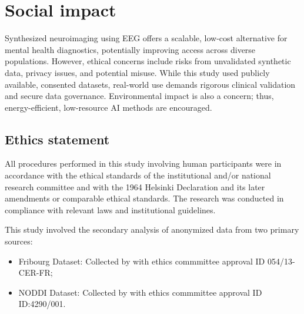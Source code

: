 \documentclass{article}
\begin{document}
\section*{Social impact}

Synthesized neuroimaging using EEG offers a scalable, low-cost alternative for mental health diagnostics, potentially improving access across diverse populations. However, ethical concerns include risks from unvalidated synthetic data, privacy issues, and potential misuse. While this study used publicly available, consented datasets, real-world use demands rigorous clinical validation and secure data governance. Environmental impact is also a concern; thus, energy-efficient, low-resource AI methods are encouraged.


\subsection*{Ethics statement}

All procedures performed in this study involving human participants were in accordance with the ethical standards of the institutional and/or national research committee and with the 1964 Helsinki Declaration and its later amendments or comparable ethical standards. The research was conducted in compliance with relevant laws and institutional guidelines.

This study involved the secondary analysis of anonymized data from two primary sources:
\begin{itemize}
    \item Fribourg Dataset: Collected by \citet{dataset2022fribourg} with ethics commmittee approval ID 054/13-CER-FR;
    \item NODDI Dataset: Collected by \citet{dataset_01} with ethics commmittee approval ID ID:4290/001.
\end{itemize}
\end{document}
